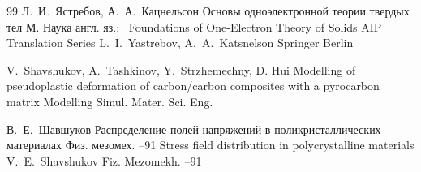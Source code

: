 \begin{thebibliography}{99}
\by Л.~И.~Ястребов, А.~А.~Кацнельсон
\book Основы одноэлектронной теории твердых тел
\publaddr М.
\publ  Наука
\transl англ. яз.:~
\book Foundations of One-Electron Theory of Solids
\serial AIP Translation Series
\by L.~I.~Yastrebov, A.~A.~Katsnelson
\publ Springer
\publaddr Berlin

\by V.~Shavshukov, A.~Tashkinov, Y.~Strzhemechny, D. Hui
\paper Modelling of pseudoplastic deformation of carbon/carbon composites with a pyrocarbon matrix
\jour  Modelling Simul. Mater. Sci. Eng. 

\by В.~Е.~Шавшуков
\paper Распределение полей напряжений в поликристаллических материалах
\jour  Физ. мезомех.
--91
\misctransl
\paper Stress field distribution in polycrystalline materials
\by V.~E.~Shavshukov 
\jour  Fiz. Mezomekh.
--91



\end{thebibliography}



\noindent
\hskip6.5cm \thedate \par\noindent
\hskip6.5cm\therevdate



\makeengtitle

\renewcommand{\baselinestretch}{0.9}


 \newpage
%
%
